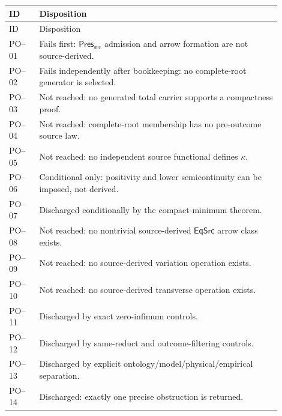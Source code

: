 \documentclass[11pt]{article}
\newcommand{\EqSrc}{\mathsf{EqSrc}}
\newcommand{\PresSrc}{\mathsf{Pres}_{\mathrm{src}}}
\begin{document}
\begin{longtable}{P{0.10\linewidth}P{0.80\linewidth}}
\toprule
ID & Disposition \\
\midrule
\endfirsthead
\toprule
ID & Disposition \\
\midrule
\endhead
PO--01 & Fails first: \(\PresSrc\) admission and arrow formation are not source-derived.\\
PO--02 & Fails independently after bookkeeping: no complete-root generator is selected.\\
PO--03 & Not reached: no generated total carrier supports a compactness proof.\\
PO--04 & Not reached: complete-root membership has no pre-outcome source law.\\
PO--05 & Not reached: no independent source functional defines \(\kappa\).\\
PO--06 & Conditional only: positivity and lower semicontinuity can be imposed, not derived.\\
PO--07 & Discharged conditionally by the compact-minimum theorem.\\
PO--08 & Not reached: no nontrivial source-derived \(\EqSrc\) arrow class exists.\\
PO--09 & Not reached: no source-derived variation operation exists.\\
PO--10 & Not reached: no source-derived transverse operation exists.\\
PO--11 & Discharged by exact zero-infimum controls.\\
PO--12 & Discharged by same-reduct and outcome-filtering controls.\\
PO--13 & Discharged by explicit ontology/model/physical/empirical separation.\\
PO--14 & Discharged: exactly one precise obstruction is returned.\\
\bottomrule
\end{longtable}
\end{document}
